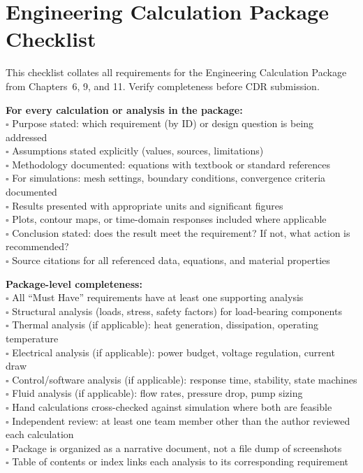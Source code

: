 \section*{Engineering Calculation Package Checklist}
This checklist collates all requirements for the Engineering Calculation Package from Chapters~6, 9, and 11. Verify completeness before CDR submission.

\textbf{For every calculation or analysis in the package:} \\
$\square$ Purpose stated: which requirement (by ID) or design question is being addressed \\
$\square$ Assumptions stated explicitly (values, sources, limitations) \\
$\square$ Methodology documented: equations with textbook or standard references \\
$\square$ For simulations: mesh settings, boundary conditions, convergence criteria documented \\
$\square$ Results presented with appropriate units and significant figures \\
$\square$ Plots, contour maps, or time-domain responses included where applicable \\
$\square$ Conclusion stated: does the result meet the requirement? If not, what action is recommended? \\
$\square$ Source citations for all referenced data, equations, and material properties

\textbf{Package-level completeness:} \\
$\square$ All ``Must Have'' requirements have at least one supporting analysis \\
$\square$ Structural analysis (loads, stress, safety factors) for load-bearing components \\
$\square$ Thermal analysis (if applicable): heat generation, dissipation, operating temperature \\
$\square$ Electrical analysis (if applicable): power budget, voltage regulation, current draw \\
$\square$ Control/software analysis (if applicable): response time, stability, state machines \\
$\square$ Fluid analysis (if applicable): flow rates, pressure drop, pump sizing \\
$\square$ Hand calculations cross-checked against simulation where both are feasible \\
$\square$ Independent review: at least one team member other than the author reviewed each calculation \\
$\square$ Package is organized as a narrative document, not a file dump of screenshots \\
$\square$ Table of contents or index links each analysis to its corresponding requirement



